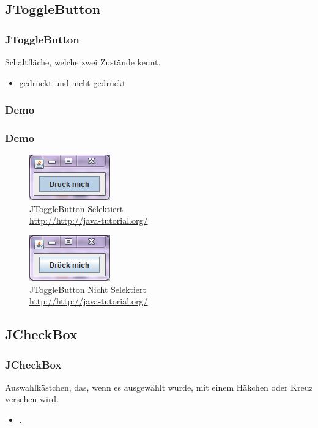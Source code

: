\documentclass[xcolor=dvipsnames]{beamer}
\begin{document}
\subsection{JToggleButton}
\begin{frame} %
  \frametitle{JToggleButton} %
  \begin{block}{Schaltfläche, welche zwei Zustände kennt.}
	  \begin{itemize}
		\item gedrückt und nicht gedrückt
	  \end{itemize}
  \end{block}
\end{frame}


\subsubsection{Demo}
\begin{frame}
  \frametitle{Demo}
	\begin{figure}
		\includegraphics[scale=1.0]{images/jtogglebutton_selected.PNG}
		\caption{JToggleButton Selektiert\\ \tiny{\textcolor{gray}{\url{http://http://java-tutorial.org/}}}}
		\end{figure}
\begin{figure}
		\includegraphics[scale=1.0]{images/jtogglebutton_notselected.PNG}
		\caption{JToggleButton Nicht Selektiert \\ \tiny{\textcolor{gray}{\url{http://http://java-tutorial.org/}}}}
		\end{figure}
\end{frame}


\subsection{JCheckBox}
\begin{frame} %
  \frametitle{JCheckBox} %
  \begin{block}{Auswahlkästchen, das, wenn es ausgewählt wurde, mit einem Häkchen oder Kreuz versehen wird.}
	  \begin{itemize}
		\item .
	  \end{itemize}
  \end{block}
\end{frame}
\end{document}
